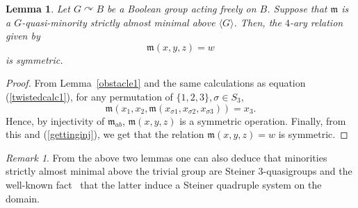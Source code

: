 \documentclass{article}
\newtheorem{lemma}[theorem]{Lemma}
\theoremstyle{remark}
\newtheorem{remark}[theorem]{Remark}
\theoremstyle{definition}
\def\acts{\curvearrowright}
\begin{document}
\begin{lemma}\label{Boolsymm} Let $G\acts B$ be a Boolean group acting freely on $B$. Suppose that $\mathfrak{m}$ is a $G$-quasi-minority strictly almost minimal above $\langle G\rangle$. Then, the $4$-ary relation given by
\[\mathfrak{m}(x,y,z)=w\]
is symmetric.
\end{lemma}
\begin{proof} 
From Lemma~\ref{obstacle1} and the same calculations as equation (\ref{twistedcalc1}), for any permutation of $\{1,2,3\}, \sigma\in S_3$,
\[\mathfrak{m}(x_1, x_2,  \mathfrak{m}(x_{\sigma 1}, x_{\sigma 2}, x_{\sigma 3}))=x_3.\]
Hence, by injectivity of $\mathfrak{m}_{ab}$, $\mathfrak{m}(x,y,z)$ is a symmetric operation. Finally, from this and (\ref{gettinginj}), we get that the relation 
$\mathfrak{m}(x,y,z)=w$ is symmetric.
\end{proof}

\begin{remark} From the above two lemmas one can also deduce that minorities strictly almost minimal above the trivial group are Steiner $3$-quasigroups and the well-known fact~\cite{lindner1978steiner} that the latter induce a Steiner quadruple system on the domain.
\end{remark}
\end{document}
